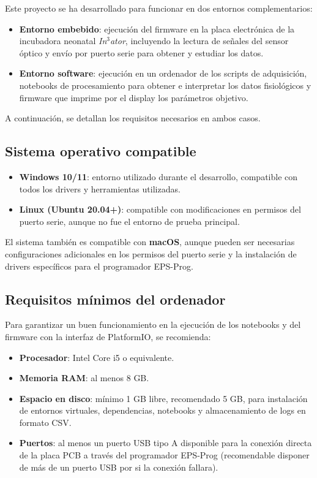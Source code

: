 Este proyecto se ha desarrollado para funcionar en dos entornos complementarios:

\begin{itemize}
  \item \textbf{Entorno embebido}: ejecución del firmware en la placa electrónica de la incubadora neonatal \textit{In$^3$ator}, incluyendo la lectura de señales del sensor óptico y envío por puerto serie para obtener y estudiar los datos.
  \item \textbf{Entorno software}: ejecución en un ordenador de los scripts de adquisición, notebooks de procesamiento para obtener e interpretar los datos fisiológicos y firmware que imprime por el display los parámetros objetivo.
\end{itemize}

A continuación, se detallan los requisitos necesarios en ambos casos.

\subsection{Sistema operativo compatible}

\begin{itemize}
  \item \textbf{Windows 10/11}: entorno utilizado durante el desarrollo, compatible con todos los drivers y herramientas utilizadas.
  \item \textbf{Linux (Ubuntu 20.04+)}: compatible con modificaciones en permisos del puerto serie, aunque no fue el entorno de prueba principal.
\end{itemize}

El sistema también es compatible con \textbf{macOS}, aunque pueden ser necesarias configuraciones adicionales en los permisos del puerto serie y la instalación de drivers específicos para el programador EPS-Prog.

\subsection{Requisitos mínimos del ordenador}

Para garantizar un buen funcionamiento en la ejecución de los notebooks y del firmware con la interfaz de PlatformIO, se recomienda:

\begin{itemize}
  \item \textbf{Procesador}: Intel Core i5 o equivalente.
  \item \textbf{Memoria RAM}: al menos 8 GB. 
  \item \textbf{Espacio en disco}: mínimo 1 GB libre, recomendado 5 GB, para instalación de entornos virtuales, dependencias, notebooks y almacenamiento de logs en formato CSV.
  \item \textbf{Puertos}: al menos un puerto USB tipo A disponible para la conexión directa de la placa PCB a través del programador EPS-Prog (recomendable disponer de más de un puerto USB por si la conexión fallara).
\end{itemize}


